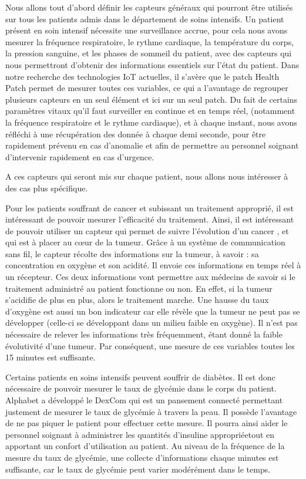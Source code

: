 \documentclass{article}
\begin{document}
Nous allons tout d’abord définir les capteurs généraux qui pourront être utilisés sur tous les patients admis dans le département de soins intensifs. Un patient présent en soin intensif nécessite une surveillance accrue, pour cela nous avons mesurer la fréquence respiratoire, le rythme cardiaque, la température du corps, la pression sanguine, et les phases de sommeil du patient, avec des capteurs qui nous permettront d’obtenir des informations essentiels sur l’état du patient.  Dans notre recherche des technologies IoT actuelles, il s’avère que le patch Health Patch \cite{HealthPatch} permet de mesurer toutes ces variables, ce qui a l’avantage de regrouper plusieurs capteurs en un seul élément  et ici sur un seul patch. Du fait de certains paramètres vitaux qu’il faut surveiller en continue et en temps réel, (notamment la fréquence respiratoire et le rythme cardiaque), et à chaque instant, nous avons réfléchi à une récupération des donnée à chaque demi seconde, pour être rapidement prévenu en cas d’anomalie et afin de permettre au personnel soignant d’intervenir rapidement en cas d’urgence.

A ces capteurs qui seront mis sur chaque patient, nous allons nous intéresser à des cas plus spécifique.

Pour les patients souffrant de cancer et subissant un traitement approprié, il est intéressant de pouvoir mesurer l’efficacité du traitement. Ainsi, il est intéressant de pouvoir utiliser un capteur qui permet de suivre l’évolution d’un cancer \cite{Cancer}, et qui est à placer au cœur de la tumeur. Grâce à un système de communication sans fil, le capteur récolte des informations sur la tumeur, à savoir : sa concentration en oxygène et son acidité. Il envoie ces informations en temps réel à un récepteur. Ces deux informations vont permettre aux médecins de savoir si le traitement administré au patient fonctionne ou non. En effet, si la tumeur s’acidifie de plus en plus, alors le traitement marche. Une hausse du taux d’oxygène est aussi un bon indicateur car elle révèle que la tumeur ne peut pas se développer (celle-ci se développant dans un milieu faible en oxygène). Il n’est pas nécessaire de relever les informations très fréquemment, étant donné la faible évolutivité d’une tumeur. Par conséquent, une mesure de ces variables toutes les 15 minutes est suffisante.

Certains patients en soins intensifs peuvent souffrir de diabètes. Il est donc nécessaire de pouvoir mesurer le taux de glycémie dans le corps du patient. Alphabet a développé le DexCom \cite{Diabete} qui  est un pansement connecté permettant justement de mesurer le taux de glycémie à travers la peau. Il possède l’avantage de ne pas piquer le patient pour effectuer cette mesure. Il pourra ainsi aider le personnel soignant à administrer les quantités d’insuline appropriéetout en apportant un confort d’utilisation au patient.  Au niveau de la fréquence de la mesure du taux de glycémie, une collecte d’informations chaque minutes est suffisante, car le taux de glycémie peut varier modérément dans le temps.
\end{document}

